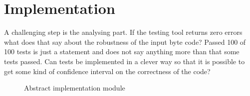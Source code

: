 \section{Implementation}
A challenging step is the analysing part. If the testing tool returns zero
errors what does that say about the robustness of the input byte code? Passed
100 of 100 tests is just a statement and does not say anything more than that
some tests passed. Can tests be implemented in a clever way so that it is
possible to get some kind of confidence interval on the correctness of the code?
\begin{figure}[!ht]

\caption{Abstract implementation module}
\end{figure}

